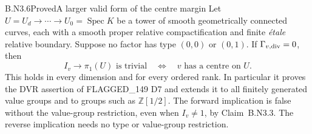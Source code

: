 \begin{claim}{B.N3.6}{Proved}{A larger valid form of the centre margin}
Let $U=U_d\to\cdots\to U_0=\operatorname{Spec}K$ be a tower of
smooth geometrically connected curves, each with a smooth proper
relative compactification and finite \emph{\'etale} relative boundary.
Suppose no factor has type $(0,0)$ or $(0,1)$.  If
$\Gamma_{v,\rm div}=0$, then
\[
 I_v\longrightarrow\pi_1(U)\text{ is trivial}
 \quad\Longleftrightarrow\quad
 v\text{ has a centre on }U.
\]
This holds in every dimension and for every ordered rank.  In
particular it proves the DVR assertion of FLAGGED\_149 D7 and
extends it to all finitely generated value groups and to groups such
as $\mathbb Z[1/2]$.  The forward implication is false without
the value-group restriction, even when $I_v\ne1$, by
Claim~B.N3.3.  The reverse implication needs no type or value-group
restriction.
\end{claim}
